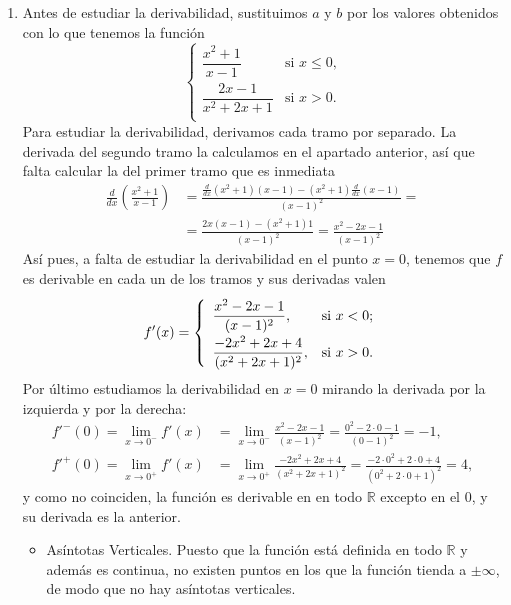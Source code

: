 {\begin{enumerate}
\item Antes de estudiar la derivabilidad, sustituimos $a$ y $b$ por los valores obtenidos con lo que tenemos la función
\[
\renewcommand{\arraystretch}{2}
\begin{cases}
\dfrac{x^2  + 1}{x - 1} & \mbox{si $x \leq 0$,} \\
\dfrac{2x-1}{x^2  + 2x + 1} & \mbox{si $x>0$.} \\
\end{cases}
\]
Para estudiar la derivabilidad, derivamos cada tramo por separado. La derivada del segundo tramo la calculamos en el apartado anterior, así que falta calcular la del primer tramo que es inmediata
\begin{align*}
\frac{d}{dx}\left(\frac{x^2+1}{x-1}\right) &=\frac{\frac{d}{dx}(x^2+1)(x-1)-(x^2+1)\frac{d}{dx}(x-1)}{(x-1)^2}=\\
&=\frac{2x(x-1)-(x^2+1)1}{(x-1)^2}=\frac{x^2-2x-1}{(x-1)^2}
\end{align*}
Así pues, a falta de estudiar la derivabilidad en el punto $x=0$, tenemos que $f$ es derivable en cada un de los tramos y sus derivadas valen
\[\renewcommand{\arraystretch}{2}
f'(x)=\left\{%
\begin{array}{ll}
\dfrac{x^2-2x-1}{(x-1)^2}, & \hbox{si $x<0$;} \\
\dfrac{-2x^2+2x+4}{(x^2+2x+1)^2}, & \hbox{si $x>0$.} \\
\end{array}%
\right.
\]
Por último estudiamos la derivabilidad en $x=0$ mirando la derivada por la izquierda y por la derecha:
\begin{align*}
f'^-(0)=\lim_{x\rightarrow 0^-}f'(x)&=\lim_{x\rightarrow 0^-}\frac{x^2-2x-1}{(x-1)^2}=\frac{0^2-2\cdot 0-1}{(0-1)^2}=-1,\\
f'^+(0)=\lim_{x\rightarrow 0^+}f'(x)&=\lim_{x\rightarrow 0^+}\frac{-2x^2+2x+4}{(x^2+2x+1)^2}=\frac{-2\cdot 0^2+2\cdot 0+4}{(0^2+2\cdot 0+1)^2}=4,
\end{align*}
y como no coinciden, la función es derivable en en todo $\mathbb{R}$ excepto en el 0, y su derivada es la anterior.

\begin{itemize}
\item Asíntotas Verticales. Puesto que la función está definida en todo $\mathbb{R}$ y además es continua, no existen puntos en los que la función tienda a $\pm\infty$, de modo que no hay asíntotas verticales.


\end{itemize}
\end{enumerate}}
